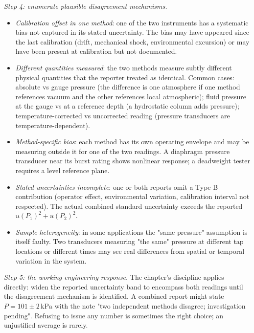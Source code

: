 \emph{Step 4: enumerate plausible disagreement mechanisms.}
\begin{itemize}[leftmargin=*]
  \item \emph{Calibration offset in one method}: one of the two
    instruments has a systematic bias not captured in its stated
    uncertainty. The bias may have appeared since the last
    calibration (drift, mechanical shock, environmental
    excursion) or may have been present at calibration but not
    documented.
  \item \emph{Different quantities measured}: the two methods
    measure subtly different physical quantities that the reporter
    treated as identical. Common cases: absolute vs gauge pressure
    (the difference is one atmosphere if one method references
    vacuum and the other references local atmospheric); fluid
    pressure at the gauge vs at a reference depth (a hydrostatic
    column adds pressure); temperature-corrected vs uncorrected
    reading (pressure transducers are temperature-dependent).
  \item \emph{Method-specific bias}: each method has its own
    operating envelope and may be measuring outside it for one of
    the two readings. A diaphragm pressure transducer near its
    burst rating shows nonlinear response; a deadweight tester
    requires a level reference plane.
  \item \emph{Stated uncertainties incomplete}: one or both
    reports omit a Type B contribution (operator effect,
    environmental variation, calibration interval not respected).
    The actual combined standard uncertainty exceeds the reported
    $u(P_{1})^{2} + u(P_{2})^{2}$.
  \item \emph{Sample heterogeneity}: in some applications the
    "same pressure" assumption is itself faulty. Two transducers
    measuring "the same" pressure at different tap locations or
    different times may see real differences from spatial or
    temporal variation in the system.
\end{itemize}

\emph{Step 5: the working engineering response.} The chapter's
discipline applies directly: widen the reported uncertainty band
to encompass both readings until the disagreement mechanism is
identified. A combined report might state $P = 101 \pm 2\,\si{
\kilo\pascal}$ with the note "two independent methods disagree;
investigation pending". Refusing to issue any number is sometimes
the right choice; an unjustified average is rarely.

